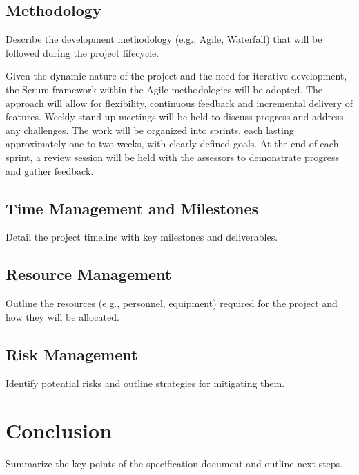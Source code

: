 \documentclass[12pt]{article}
\begin{document}
    \subsection{Methodology}
    Describe the development methodology (e.g., Agile, Waterfall) that will be followed during the project lifecycle.

    Given the dynamic nature of the project and the need for iterative development, the Scrum framework within the Agile methodologies will be adopted. The approach will allow for flexibility, continuous feedback
    and incremental delivery of features. Weekly stand-up meetings will be held to discuss progress and address any challenges. The work will be organized into sprints, each lasting approximately one to two weeks,
    with clearly defined goals. At the end of each sprint, a review session will be held with the assessors to demonstrate progress and gather feedback.

    \subsection{Time Management and Milestones}
    Detail the project timeline with key milestones and deliverables.

    \subsection{Resource Management}
    Outline the resources (e.g., personnel, equipment) required for the project and how they will be allocated.

    \subsection{Risk Management}
    Identify potential risks and outline strategies for mitigating them.

\section{Conclusion}
Summarize the key points of the specification document and outline next steps.
\end{document}
